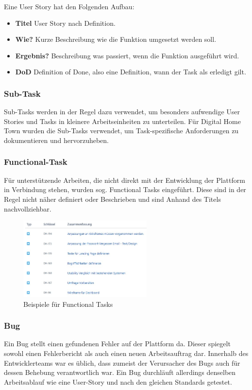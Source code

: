 Eine User Story hat den Folgenden Aufbau:
\begin{itemize}
    \item \textbf{Titel} User Story nach Definition.
    \item \textbf{Wie?} Kurze Beschreibung wie die Funktion umgesetzt werden soll.
    \item \textbf{Ergebnis?} Beschreibung was passiert, wenn die Funktion ausgeführt wird.
    \item \textbf{DoD} Definition of Done, also eine Definition, wann der Task als erledigt gilt.
\end{itemize}

\subsubsection*{Sub-Task}
Sub-Tasks werden in der Regel dazu verwendet, um besonders aufwendige User Stories und Tasks in kleinere Arbeitseinheiten zu unterteilen. Für Digital Home Town wurden die Sub-Tasks verwendet, um Task-spezifische Anforderungen zu dokumentieren und hervorzuheben. 
\subsubsection*{Functional-Task}
Für unterstützende Arbeiten, die nicht direkt mit der Entwicklung der Plattform in Verbindung stehen, wurden sog. Functional Tasks eingeführt. Diese sind in der Regel nicht näher definiert oder Beschrieben und sind Anhand des Titels nachvollziehbar. 

\begin{figure}[ht!]
    \centering
    \includegraphics[width=0.6\textwidth]{figures/andre/functionaltasks.jpg}
    \caption{Beispiele für Functional Tasks}
    \label{fig:functionaltasks}
\end{figure}

\subsubsection*{Bug}
Ein Bug stellt einen gefundenen Fehler auf der Plattform da. Dieser spiegelt sowohl einen Fehlerbericht als auch einen neuen Arbeitsauftrag dar. Innerhalb des Entwicklerteams war es üblich, dass zumeist der Verursacher des Bugs auch für dessen Behebung verantwortlich war. Ein Bug durchläuft allerdings denselben Arbeitsablauf wie eine User-Story und nach den gleichen Standards getestet.

